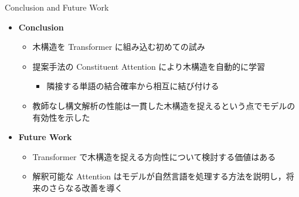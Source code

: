 \documentclass[unicode, 12pt, aspectratio=43]{beamer}
\begin{document}
\begin{frame}[label={sec:org9ae1936}]{Conclusion and Future Work}
\begin{itemize}
\item \textbf{Conclusion}
\begin{itemize}
\item 木構造を Transformer に組み込む初めての試み
\item 提案手法の Constituent Attention により木構造を自動的に学習
\begin{itemize}
\item 隣接する単語の結合確率から相互に結び付ける
\end{itemize}
\item 教師なし構文解析の性能は一貫した木構造を捉えるという点でモデルの有効性を示した
\end{itemize}

\item \textbf{Future Work}
\begin{itemize}
\item Transformer で木構造を捉える方向性について検討する価値はある
\item 解釈可能な Attention はモデルが自然言語を処理する方法を説明し，将来のさらなる改善を導く
\end{itemize}
\end{itemize}
\end{frame}
\end{document}
